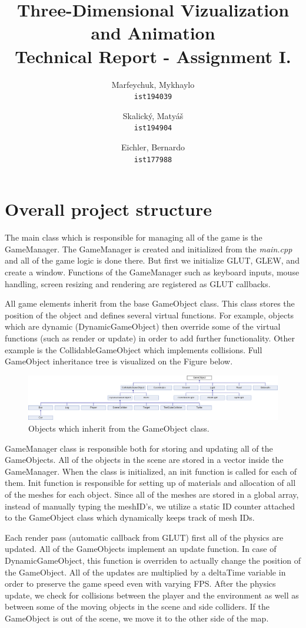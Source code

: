 \documentclass[a4paper,10pt]{article}
\title{Three-Dimensional Vizualization and Animation\\Technical Report - Assignment I.}
\author{
  Marfeychuk, Mykhaylo\\
  \texttt{ist194039}
  \and
  Skalický, Matyáš\\
  \texttt{ist194904}
  \and
  Eichler, Bernardo\\
  \texttt{ist177988}
}
\date{} %
\begin{document}
\maketitle

\section{Overall project structure}
The main class which is responsible for managing all of the game is the GameManager. The GameManager is created and initialized from the \textit{main.cpp} and all of the game logic is done there. But first we initialize GLUT, GLEW, and create a window. Functions of the GameManager such as keyboard inputs, mouse handling, screen resizing and rendering are registered as GLUT callbacks.

All game elements inherit from the base GameObject class. This class stores the position of the object and defines several virtual functions. For example, objects which are dynamic (DynamicGameObject) then override some of the virtual functions (such as render or update) in order to add further functionality. Other example is the CollidableGameObject which implements collisions. Full GameObject inheritance tree is visualized on the Figure below.

\begin{figure}[!htb]
	\centering
  	\includegraphics[width=\linewidth]{images/image1.png}
  	\caption{Objects which inherit from the GameObject class.}
\end{figure}

GameManager class is responsible both for storing and updating all of the GameObjects. All of the objects in the scene are stored in a vector inside the GameManager. When the class is initialized, an init function is called for each of them. Init function is responsible for setting up of materials and allocation of all of the meshes for each object. Since all of the meshes are stored in a global array, instead of manually typing the meshID's, we utilize a static ID counter attached to the GameObject class which dynamically keeps track of mesh IDs.

Each render pass (automatic callback from GLUT) first all of the physics are updated. All of the GameObjects implement an update function. In case of DynamicGameObject, this function is overriden to actually change the position of the GameObject. All of the updates are multiplied by a deltaTime variable in order to preserve the game speed even with varying FPS. After the physics update, we check for collisions between the player and the environment as well as between some of the moving objects in the scene and side colliders. If the GameObject is out of the scene, we move it to the other side of the map.
\end{document}
